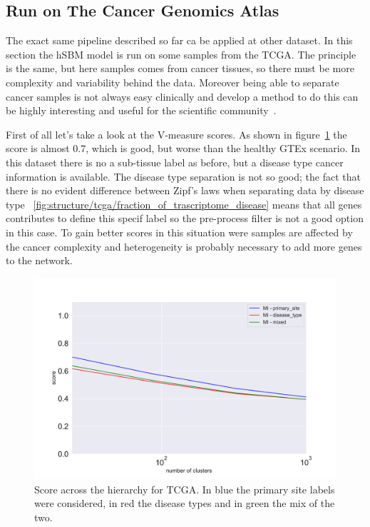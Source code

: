 \subsection{Run on The Cancer Genomics Atlas}
The exact same pipeline described so far ca be applied at other dataset. In this section the hSBM model is run on some samples from the TCGA. The principle is the same, but here samples comes from cancer tissues, so there must be more complexity and variability behind the data. Moreover being able to separate cancer samples is not always easy clinically and develop a method to do this can be highly interesting and useful for the scientific community~\cite{Farver2018}. 

First of all let's take a look at the V-measure scores. As shown in figure~\ref{fig:topic/tcga/metric} the score is almost $0.7$, which is good, but worse than the healthy GTEx scenario. In this dataset there is no a sub-tissue label as before, but a disease type cancer information is available. The disease type separation is not so good; the fact that there is no evident difference between Zipf's laws when separating data by disease type ~\ref{fig:structure/tcga/fraction_of_trascriptome_disease} means that all genes contributes to define this specif label so the pre-process filter is not a good option in this case. To gain better scores in this situation were samples are affected by the cancer complexity and heterogeneity is probably necessary to add more genes to the network.
\begin{figure}[htb!]
    \centering
    \includegraphics[width=0.8\linewidth]{pictures/topic/tcga/metric.pdf}
    \caption{Score across the hierarchy for TCGA. In blue the primary site labels were considered, in red the disease types and in green the mix of the two.}
    \label{fig:topic/tcga/metric}
\end{figure}

